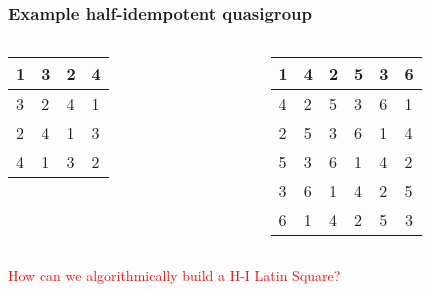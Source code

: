 \begin{frame}
\frametitle{Example half-idempotent quasigroup}

\begin{columns}
	\begin{table}
		\centering
		\begin{tabular}{|l|l|l|l|} 
			\hline
			1 & 3 & 2 & 4  \\ 
			\hline
			3 & 2 & 4 & 1  \\ 
			\hline
			2 & 4 & 1 & 3  \\ 
			\hline
			4 & 1 & 3 & 2  \\
			\hline
		\end{tabular}
	\end{table}
	\begin{table}
		\centering
		\begin{tabular}{|l|l|l|l|l|l|} 
			\hline
			1 & 4 & 2 & 5 & 3 & 6                       \\ 
			\hline
			4 & 2 & 5 & 3 & 6 & 1                       \\ 
			\hline
			2 & 5 & 3 & 6 & 1 & 4                       \\ 
			\hline
			5 & 3 & 6 & 1 & 4 & 2                       \\ 
			\hline
			3 & 6 & 1 & 4 & 2 & 5                       \\ 
			\hline
			6 & 1 & 4 & 2 & 5 & \multicolumn{1}{c|}{3}  \\
			\hline
		\end{tabular}
	\end{table}
	
\end{columns}
\pause
\textcolor{red}{How can we algorithmically build a H-I Latin Square?}
\end{frame}



